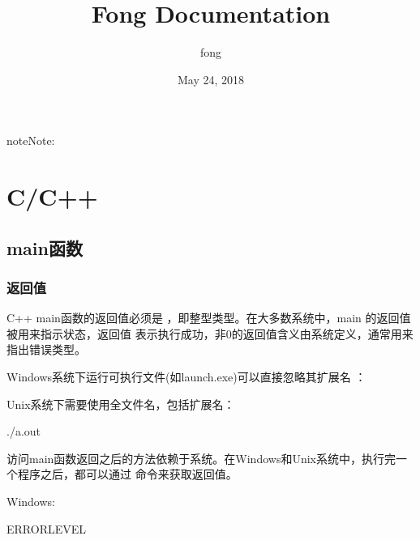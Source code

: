 \documentclass[letterpaper,10pt,english]{sphinxmanual}
\title{Fong Documentation}
\date{May 24, 2018}
\author{fong}
\begin{document}
\maketitle
\sphinxtableofcontents
{}\label{\detokenize{index::doc}}


\begin{sphinxadmonition}{note}{Note:}
\end{sphinxadmonition}


\chapter{C/C++}
\label{\detokenize{cpp/index:c-c}}\label{\detokenize{cpp/index::doc}}\label{\detokenize{cpp/index:id1}}

\section{main函数}
\label{\detokenize{cpp/01_main:main}}\label{\detokenize{cpp/01_main::doc}}

\subsection{返回值}
\label{\detokenize{cpp/01_main:id1}}
C++ main函数的返回值必须是  ，即整型类型。在大多数系统中，main 的返回值被用来指示状态，返回值  表示执行成功，非0的返回值含义由系统定义，通常用来指出错误类型。

Windows系统下运行可执行文件(如launch.exe)可以直接忽略其扩展名  ：

%
\begin{sphinxVerbatim}[commandchars=\\\{\}]
\end{sphinxVerbatim}

Unix系统下需要使用全文件名，包括扩展名：

%
\begin{sphinxVerbatim}[commandchars=\\\{\}]
./a.out
\end{sphinxVerbatim}

访问main函数返回之后的方法依赖于系统。在Windows和Unix系统中，执行完一个程序之后，都可以通过  命令来获取返回值。

Windows:

%
\begin{sphinxVerbatim}[commandchars=\\\{\}]
 \PYGZpc{}ERRORLEVEL\PYGZpc{}
\end{sphinxVerbatim}
\end{document}
